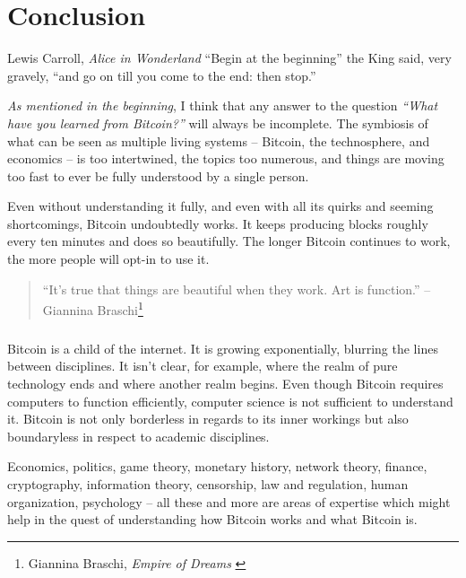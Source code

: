 \label{ch:conclusion}

\chapter*{Conclusion}

\begin{chapquote}{Lewis Carroll, \textit{Alice in Wonderland}}
``Begin at the beginning'' the King said, very gravely, ``and go on till you
come to the end: then stop.''
\end{chapquote}

\textit{As mentioned in the beginning}, I think that any answer to the
question \textit{“What have you learned from Bitcoin?”} will always be incomplete. The
symbiosis of what can be seen as multiple living systems -- Bitcoin, the
technosphere, and economics -- is too intertwined, the topics too numerous, and
things are moving too fast to ever be fully understood by a single person.

Even without understanding it fully, and even with all its quirks and seeming
shortcomings, Bitcoin undoubtedly works. It keeps producing blocks roughly every
ten minutes and does so beautifully. The longer Bitcoin continues to work, the
more people will opt-in to use it.

\begin{quotation}
\enquote{It's true that things are beautiful when they work. Art is function.}
\flushright -- Giannina Braschi\footnote{Giannina Braschi, \textit{Empire of Dreams} \cite{braschi2011empire}}
\end{quotation}

\paragraph{} Bitcoin is a child of the internet. It is growing exponentially,
blurring the lines between disciplines. It isn’t clear, for example, where the
realm of pure technology ends and where another realm begins. Even though
Bitcoin requires computers to function efficiently, computer science is not
sufficient to understand it. Bitcoin is not only borderless in regards to its
inner workings but also boundaryless in respect to academic disciplines.

Economics, politics, game theory, monetary history, network theory, finance,
cryptography, information theory, censorship, law and regulation, human
organization, psychology -- all these and more are areas of expertise which might
help in the quest of understanding how Bitcoin works and what Bitcoin is.

